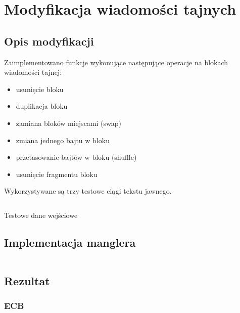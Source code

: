 \documentclass[12pt]{article}
\newenvironment*{dummyenv}{}{}
\begin{document}
\section{Modyfikacja wiadomości tajnych}

\subsection{Opis modyfikacji}

Zaimplementowano funkcje wykonujące następujące operacje na blokach
wiadomości tajnej:

\begin{itemize}
	\item usunięcie bloku
	\item duplikacja bloku
	\item zamiana bloków miejscami (swap)
	\item zmiana jednego bajtu w bloku
	\item przetasowanie bajtów w bloku (shuffle)
	\item usunięcie fragmentu bloku
\end{itemize}

Wykorzystywane są trzy testowe ciągi tekstu jawnego.

\begin{listing}[H]
	\inputminted[firstline=20,lastline=24]{python}{../aes_tests.py}
	\caption{Testowe dane wejściowe}
\end{listing}

\newpage

\subsection{Implementacja manglera}

\inputminted[firstline=72,lastline=165]{python}{../aes_tests.py}

\subsection{Rezultat}

\subsubsection{ECB}

\begin{dummyenv}
	\inputminted[breaklines,firstline=1,lastline=51]{yaml}{2-mangled-ecb.txt}
\end{dummyenv}
\end{document}
